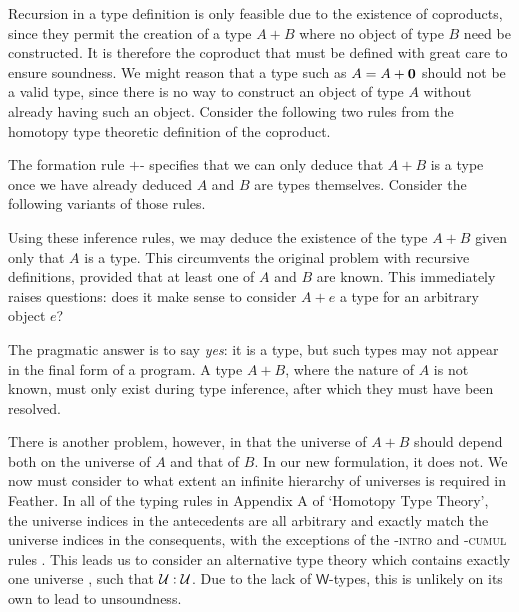 \documentclass[UKenglish, 11pt, a4paper, parskip=half]{scrbook}
\begin{document}
Recursion in a type definition is only feasible due to the existence of coproducts, since they permit the creation of a type \( A + B \) where no object of type \( B \) need be constructed.
It is therefore the coproduct that must be defined with great care to ensure soundness.
We might reason that a type such as \( A = A + \mathbf{0} \) should not be a valid type, since there is no way to construct an object of type \( A \) without already having such an object.
Consider the following two rules from the homotopy type theoretic definition of the coproduct.
The formation rule \( + \)-\rform{} specifies that we can only deduce that \( A+B \) is a type once we have already deduced \( A \) and \( B \) are types themselves.
Consider the following variants of those rules.
Using these inference rules, we may deduce the existence of the type \( A+B \) given only that \( A \) is a type.
This circumvents the original problem with recursive definitions, provided that at least one of \( A \) and \( B \) are known.
This immediately raises questions: does it make sense to consider \( A + e \) a type for an arbitrary object \( e \)?

The pragmatic answer is to say \textit{yes}: it is a type, but such types may not appear in the final form of a program.
A type \( A + B \), where the nature of \( A \) is not known, must only exist during type inference, after which they must have been resolved.

There is another problem, however, in that the universe of \( A + B \) should depend both on the universe of \( A \) and that of \( B \).
In our new formulation, it does not.
We now must consider to what extent an infinite hierarchy of universes is required in Feather.
In all of the typing rules in Appendix A of `Homotopy Type Theory', the universe indices in the antecedents are all arbitrary and exactly match the universe indices in the consequents, with the exceptions of the \UU-\textsc{intro} and \UU-\textsc{cumul} rules \cite{hottbook}.
This leads us to consider an alternative type theory which contains exactly one universe \UU{}, such that \( \mathcal{U} : \mathcal{U} \).
Due to the lack of \( \mathsf{W} \)-types, this is unlikely on its own to lead to unsoundness.
\end{document}
